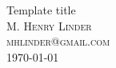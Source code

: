 \documentclass{article}
\begin{document}
{
    \centering
    \large Template title \\[.5em]
    \small\scshape M. Henry Linder \\
    \footnotesize mhlinder@gmail.com \\[.5em]
    \small \today
    \par
}


\end{document}
